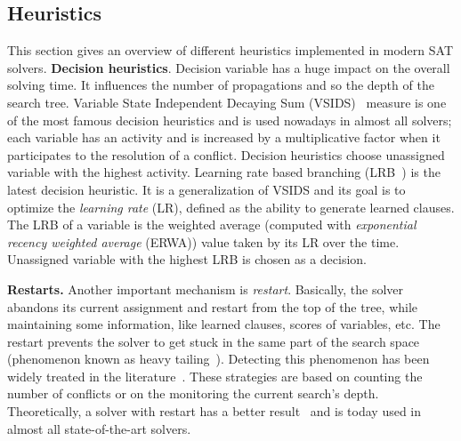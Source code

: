 \subsection{Heuristics}\label{sec:heuristics}
This section gives an overview of different heuristics implemented in modern SAT solvers.
\textbf{Decision heuristics}.
 Decision variable has a huge impact on the 
overall solving time. It influences the number of propagations and so 
the depth of the search tree.
 Variable State Independent Decaying Sum (VSIDS)~\cite{moskewicz2001chaff} measure is one of the most famous decision heuristics and is used
nowadays in almost all solvers; each variable has an activity and  is increased by a multiplicative factor 
when it participates to the resolution of a conflict.
Decision heuristics choose unassigned variable with the highest activity.
Learning rate based branching (LRB~\cite{liang2016learning}) is the latest decision heuristic. It is a
generalization of VSIDS and its goal is to optimize the \emph{learning rate} (LR), defined as the ability to generate
learned clauses. The LRB of a variable is the weighted average (computed with \emph{exponential recency
weighted average} (ERWA))  value taken by its LR over the time. Unassigned variable with the highest LRB is chosen as a decision. 

\textbf{Restarts.}
Another important mechanism is \emph{restart}. Basically, the solver abandons its current assignment and 
restart from the top of the tree, while maintaining some information, like learned clauses, scores of variables, etc.
 The restart prevents the solver to get stuck in the same part of the search space (phenomenon known as heavy tailing~\cite{gomes1997heavy}).
Detecting this phenomenon has been widely treated in the literature~\cite{audemard2012refining,biere2008adaptive}.
These strategies are based on counting the number of conflicts or on the monitoring the current search’s depth.
Theoretically, a solver with restart has a better result~\cite{huang2007effect} and is today
used in almost all state-of-the-art solvers.


